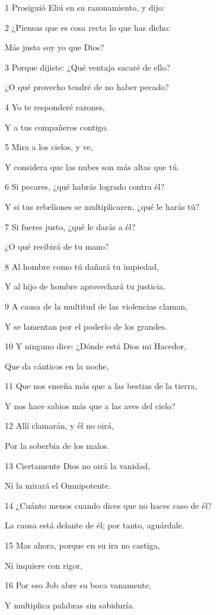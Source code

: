 \par 1 Prosiguió Eliú en su razonamiento, y dijo:
\par 2 ¿Piensas que es cosa recta lo que has dicho:
\par Más justo soy yo que Dios?
\par 3 Porque dijiste: ¿Qué ventaja sacaré de ello?
\par ¿O qué provecho tendré de no haber pecado?
\par 4 Yo te responderé razones, 
\par Y a tus compañeros contigo.
\par 5 Mira a los cielos, y ve, 
\par Y considera que las nubes son más altas que tú. 
\par 6 Si pecares, ¿qué habrás logrado contra él?
\par Y si tus rebeliones se multiplicaren, ¿qué le harás tú?
\par 7 Si fueres justo, ¿qué le darás a él?
\par ¿O qué recibirá de tu mano?
\par 8 Al hombre como tú dañará tu impiedad,
\par Y al hijo de hombre aprovechará tu justicia. 
\par 9 A causa de la multitud de las violencias claman,
\par Y se lamentan por el poderío de los grandes.
\par 10 Y ninguno dice: ¿Dónde está Dios mi Hacedor,
\par Que da cánticos en la noche,
\par 11 Que nos enseña más que a las bestias de la tierra,
\par Y nos hace sabios más que a las aves del cielo?
\par 12 Allí clamarán, y él no oirá,
\par Por la soberbia de los malos.
\par 13 Ciertamente Dios no oirá la vanidad,
\par Ni la mirará el Omnipotente.
\par 14 ¿Cuánto menos cuando dices que no haces caso de él?
\par La causa está delante de él; por tanto, aguárdale.
\par 15 Mas ahora, porque en su ira no castiga,
\par Ni inquiere con rigor,
\par 16 Por eso Job abre su boca vanamente,
\par Y multiplica palabras sin sabiduría.

